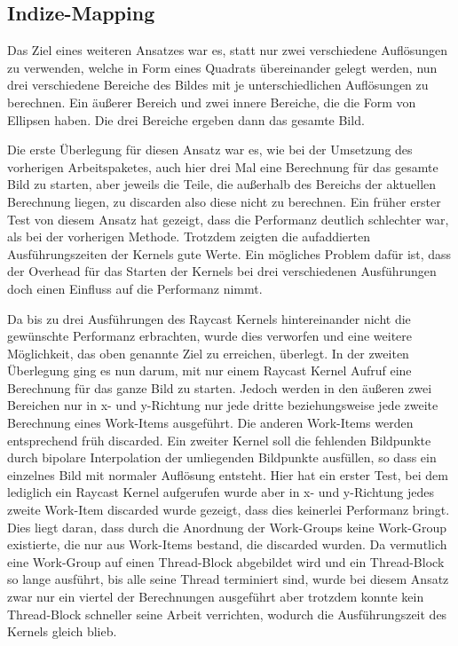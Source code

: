 \subsection{Indize-Mapping}\label{ss::DDC}
Das Ziel eines weiteren Ansatzes war es, statt nur zwei verschiedene Auflösungen zu verwenden, welche in Form eines Quadrats übereinander gelegt werden, nun drei verschiedene Bereiche des Bildes mit je unterschiedlichen Auflösungen zu berechnen.
Ein äußerer Bereich und zwei innere Bereiche, die die Form von Ellipsen haben.
Die drei Bereiche ergeben dann das gesamte Bild.

Die erste Überlegung für diesen Ansatz war es, wie bei der Umsetzung des vorherigen Arbeitspaketes, auch hier drei Mal eine Berechnung für das gesamte Bild zu starten, aber jeweils die Teile, die außerhalb des Bereichs der aktuellen Berechnung liegen, zu discarden also diese nicht zu berechnen.
Ein früher erster Test von diesem Ansatz hat gezeigt, dass die Performanz deutlich schlechter war, als bei der vorherigen Methode.
Trotzdem zeigten die aufaddierten Ausführungszeiten der Kernels gute Werte.
Ein mögliches Problem dafür ist, dass der Overhead für das Starten der Kernels bei drei verschiedenen Ausführungen doch einen Einfluss auf die Performanz nimmt.

Da bis zu drei Ausführungen des Raycast Kernels hintereinander nicht die gewünschte Performanz erbrachten, wurde dies verworfen und eine weitere Möglichkeit, das oben genannte Ziel zu erreichen, überlegt.
In der zweiten Überlegung ging es nun darum, mit nur einem Raycast Kernel Aufruf eine Berechnung für das ganze Bild zu starten.
Jedoch werden in den äußeren zwei Bereichen nur in x- und y-Richtung nur jede dritte beziehungsweise jede zweite Berechnung eines Work-Items ausgeführt.
Die anderen Work-Items werden entsprechend früh discarded.
Ein zweiter Kernel soll die fehlenden Bildpunkte durch bipolare Interpolation der umliegenden Bildpunkte ausfüllen, so dass ein einzelnes Bild mit normaler Auflösung entsteht.
Hier hat ein erster Test, bei dem lediglich ein Raycast Kernel aufgerufen wurde aber in x- und y-Richtung jedes zweite Work-Item discarded wurde gezeigt, dass dies keinerlei Performanz bringt.
Dies liegt daran, dass durch die Anordnung der Work-Groups keine Work-Group existierte, die nur aus Work-Items bestand, die discarded wurden.
Da vermutlich eine Work-Group auf einen Thread-Block abgebildet wird und ein Thread-Block so lange ausführt, bis alle seine Thread terminiert sind, wurde bei diesem Ansatz zwar nur ein viertel der Berechnungen ausgeführt aber trotzdem konnte kein Thread-Block schneller seine Arbeit verrichten, wodurch die Ausführungszeit des Kernels gleich blieb.

